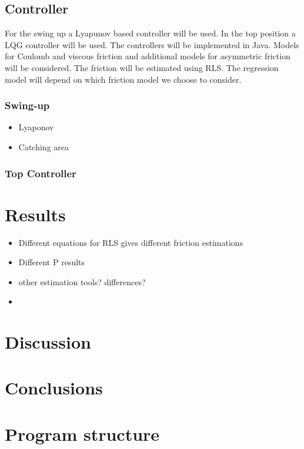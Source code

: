 \documentclass[10pt,a4paper]{article}
\begin{document}
\subsection{Controller}
For the swing up a Lyapunov based controller will be used. In the top position a LQG controller will be used. The controllers will be implemented in Java.
Models for Coulomb and viscous friction and additional models for asymmetric friction will be considered. The friction will be estimated using RLS. The regression model will depend on which friction model we choose to consider. 
\subsubsection{Swing-up}
\begin{itemize}
\item Lyaponov
\item Catching area
\end{itemize}
\subsubsection{Top Controller}

\section{Results}
\begin{itemize}
\item Different equations for RLS gives different friction estimations
\item Different P results
\item other estimation tools? differences?
\item 
\end{itemize}
\section{Discussion}
\section{Conclusions}










\section{Program structure}
\end{document}
